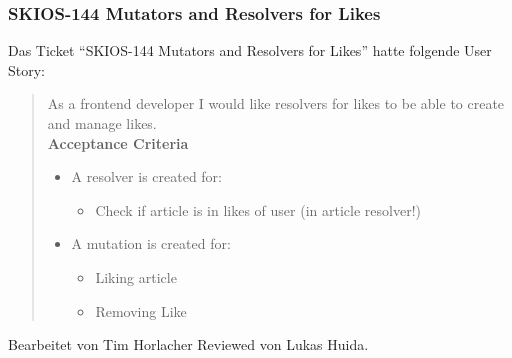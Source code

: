 \subsubsection{SKIOS-144 Mutators and Resolvers for Likes}
Das Ticket \enquote{SKIOS-144 Mutators and Resolvers for Likes} hatte folgende User Story:
\begin{quotation}
    As a frontend developer I would like resolvers for likes to be able to create and manage likes. \\
\textbf{Acceptance Criteria}
\begin{itemize}
    \item A resolver is created for:
    \begin{itemize}
        \item Check if article is in likes of user (in article resolver!)
    \end{itemize}
    \item A mutation is created for:
    \begin{itemize}
        \item Liking article
        \item Removing Like
    \end{itemize}
\end{itemize}
\end{quotation}
Bearbeitet von Tim Horlacher
Reviewed von Lukas Huida.

